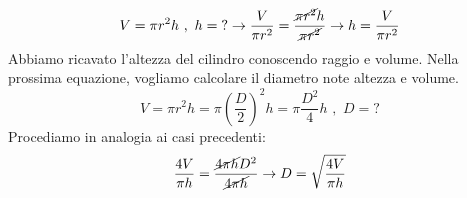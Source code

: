\[
V=\pi r^2 h \,\,\text{,}\,\,\,  h=\text{?} \rightarrow \frac{V}{\pi r^2} = \frac{\cancel{ \pi r^2} h}{\cancel{\pi r^2}} \rightarrow h= \frac{V}{\pi r^2 }
\]
Abbiamo ricavato l'altezza del cilindro conoscendo raggio e volume. Nella prossima equazione, vogliamo calcolare il diametro note altezza e volume.
\[
V=\pi r^2 h =\pi \left(\frac{D}{2} \right)^2 h= \pi \frac{D^2}{4}  h\,\,\text{,}\,\,\,  D=\text{?} 
\]
Procediamo in analogia ai casi precedenti:
\[
\frac{4 V}{\pi h} = \frac{ \cancel{ 4 \pi h }D^2 }{ \cancel{4 \pi h}} \rightarrow D=\sqrt{\frac{4 V}{\pi h}}
\]




